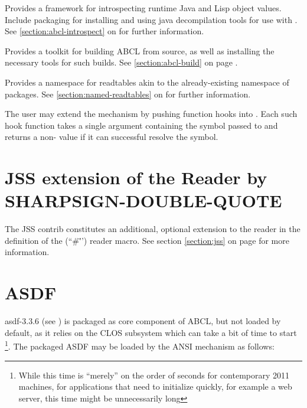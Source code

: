 \documentclass[10pt]{book}
\begin{document}
\begin{description}[style=nextline]
\begin{description}[style=nextline]
    \item[\code{abcl-introspect}] Provides a framework for
      introspecting runtime Java and Lisp object values.  Include
      packaging for installing and using java decompilation tools
      for use with .  See
      \ref{section:abcl-introspect} on
      \pageref{section:abcl-introspect} for further information.
      
    \item[\code{abcl-build}] Provides a toolkit for building ABCL
      from source, as well as installing the necessary tools for
      such builds.  See \ref{section:abcl-build} on page
      \pageref{section:abcl-build}.

    \item[\code{named-readtables}] Provides a namespace for
      readtables akin to the already-existing namespace of packages.
      See \ref{section:named-readtables} on
      \pageref{section:named-readtables} for further information.

    \end{description}
\end{description}

The user may extend the  mechanism by pushing
function hooks into .  Each
such hook function takes a single argument containing the symbol
passed to  and returns a non- value if it
can successful resolve the symbol.

\section{JSS extension of the Reader by SHARPSIGN-DOUBLE-QUOTE}

The JSS contrib constitutes an additional, optional extension to the
reader in the definition of the 
(``\#\"'') reader macro.  See section \ref{section:jss} on page
\pageref{section:jss} for more information.

\section{ASDF}

asdf-3.3.6 (see \cite{asdf}) is packaged as core component of
\textsc{ABCL}, but not loaded by default, as it relies on the
\textsc{CLOS} subsystem which can take a bit of time to
start \footnote{While this time is ``merely'' on the order of seconds
for contemporary 2011 machines, for applications that need to
initialize quickly, for example a web server, this time might be
unnecessarily long}.  The packaged \textsc{ASDF} may be loaded by the
\textsc{ANSI}  mechanism as follows:
\end{document}
